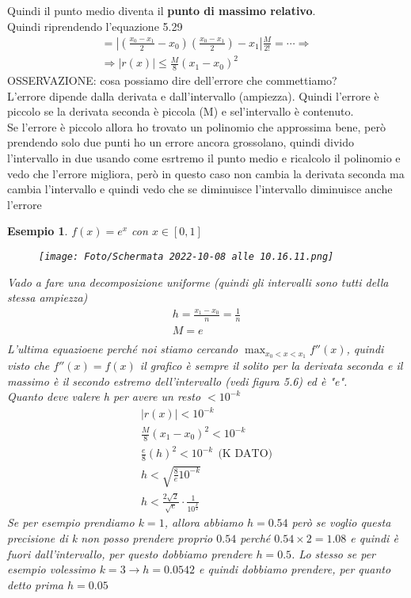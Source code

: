 \documentclass[a4paper, portrait]{book}
\numberwithin{equation}{chapter} %
\newtheorem{example}{Esempio}
\begin{document}
Quindi il punto medio diventa il \textbf{punto di massimo relativo}.\\
Quindi riprendendo l'equazione 5.29
\begin{gather}
    = \left|\left(\frac{x_0 - x_1}{2} - x_0\right)\left(\frac{x_0 - x_1}{2}\right)-x_1\right|\frac{M}{2!} = \cdots \Rightarrow\\
    \Rightarrow |r(x)| \leq \frac{M}{8}(x_1-x_0)^2
\end{gather}
OSSERVAZIONE: cosa possiamo dire dell'errore che commettiamo?\\
L'errore dipende dalla derivata e dall'intervallo (ampiezza). Quindi l'errore è piccolo se la derivata seconda è piccola (M) e sel'intervallo è contenuto.\\
Se l'errore è piccolo allora ho trovato un polinomio che approssima bene, però prendendo solo due punti ho un errore ancora grossolano, quindi divido l'intervallo in due usando come esrtremo il punto medio e ricalcolo il polinomio e vedo che l'errore migliora, però in questo caso non cambia la derivata seconda ma cambia l'intervallo e quindi vedo che se diminuisce l'intervallo diminuisce anche l'errore
\begin{example}
    $f(x) = e^x$ con $x \in [0,1]$
    \begin{figure}[h!]
        \centering
        \texttt{[image: Foto/Schermata 2022-10-08 alle 10.16.11.png]}
        \caption{}
    \end{figure}
    Vado a fare una decomposizione uniforme (quindi gli intervalli sono tutti della stessa ampiezza)
    \begin{gather}
        h = \frac{x_1 - x_0}{n} = \frac{1}{n}\\
        M = e\\
    \end{gather}
    L'ultima equazioene perché noi stiamo cercando $\max_{x_0 < x < x_1}f''(x)$, quindi visto che $f''(x) = f(x)$ il grafico è sempre il solito per la derivata seconda e il massimo è il secondo estremo dell'intervallo (vedi figura 5.6) ed è "e".\\
    Quanto deve valere h per avere un resto $< 10^{-k}$
    \begin{gather}
        |r(x)| < 10^{-k}\\
        \frac{M}{8}(x_1 - x_0)^2 < 10^{-k}\\
        \frac{e}{8}(h)^2 < 10^{-k} \ \ \text{(K DATO)}\\
        h < \sqrt{\frac{8}{e}10^{-k}}\\
        h < \frac{2\sqrt{2}}{\sqrt{e}} \cdot \frac{1}{10^{\frac{k}{2}}}
    \end{gather}
    Se per esempio prendiamo $k = 1$, allora abbiamo $h = 0.54$ però se voglio questa precisione di k non posso prendere proprio $0.54$ perché $0.54 \times 2 = 1.08$ e quindi è fuori dall'intervallo, per questo dobbiamo prendere $h = 0.5$. Lo stesso se per esempio volessimo $k = 3 \rightarrow h = 0.0542$ e quindi dobbiamo prendere, per quanto detto prima $h = 0.05$
\end{example}
\end{document}
